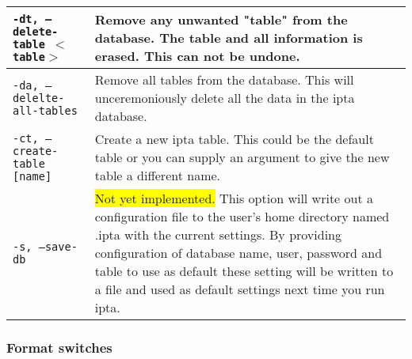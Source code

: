 \documentclass[english,twoside,openright,a4paper,12pt]{article}
\newcommand{\hilight}[1]{\colorbox{yellow}{#1}}
\begin{document}
\begin{longtable}{|p{}|p{}|}
\texttt{-dt, --delete-table $<$table$>$} & 

Remove any unwanted "table" from the database. The table and all
information is erased. This can not be undone.\\\hline

\texttt{-da, --delelte-all-tables} & 

Remove all tables from the database. This will unceremoniously delete
all the data in the ipta database.\\\hline

\texttt{-ct, --create-table [name]} & 

Create a new ipta table. This could be the default table or you can
supply an argument to give the new table a different name. \\\hline

\texttt{-s, --save-db} & 

\hilight{Not yet implemented.} This option will write out a
configuration file to the user's home directory named .ipta with the
current settings. By providing configuration of database name, user,
password and table to use as default these setting will be written to
a file and used as default settings next time you run ipta.\\\hline
\end{longtable}
\normalsize

\subsubsection{Format switches}
\end{document}
